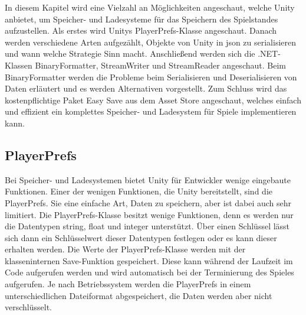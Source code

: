 In diesem Kapitel wird eine Vielzahl an Möglichkeiten angeschaut, welche Unity anbietet, um Speicher- und Ladesysteme für das Speichern des Spielstandes aufzustellen. Als erstes wird Unitys PlayerPrefs-Klasse angeschaut. Danach werden verschiedene Arten aufgezählt, Objekte von Unity in \ac{json} zu serialisieren und wann welche Strategie Sinn macht. Anschließend werden sich die .NET-Klassen BinaryFormatter, StreamWriter und StreamReader angeschaut. Beim BinaryFormatter werden die Probleme beim Serialisieren und Deserialisieren von Daten erläutert und es werden Alternativen vorgestellt. Zum Schluss wird das kostenpflichtige Paket Easy Save aus dem Asset Store angeschaut, welches einfach und effizient ein komplettes Speicher- und Ladesystem für Spiele implementieren kann.



\subsection{PlayerPrefs}
Bei Speicher- und Ladesystemen bietet Unity für Entwickler wenige eingebaute Funktionen. Einer der wenigen Funktionen, die Unity bereitstellt, sind die PlayerPrefs. Sie eine einfache Art, Daten zu speichern, aber ist dabei auch sehr limitiert. Die PlayerPrefs-Klasse besitzt wenige Funktionen, denn es werden nur die Datentypen string, float und integer unterstützt. Über einen Schlüssel lässt sich dann ein Schlüsselwert dieser Datentypen festlegen oder es kann dieser erhalten werden. Die Werte der PlayerPrefs-Klasse werden mit der klasseninternen Save-Funktion gespeichert. Diese kann während der Laufzeit im Code aufgerufen werden und wird automatisch bei der Terminierung des Spieles aufgerufen.\cite{unityPlayerPrefsSave} Je nach Betriebssystem werden die PlayerPrefs in einem unterschiedlichen Dateiformat abgespeichert, die Daten werden aber nicht verschlüsselt.\cite{unityPlayerPrefs}

